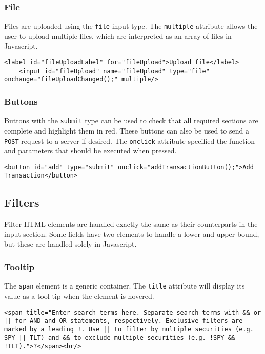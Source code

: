 \documentclass[letterpaper]{article}
\begin{document}
\subsubsection{File}

Files are uploaded using the \lstinline{file} input type.
The \lstinline{multiple} attribute allows the user to upload multiple files, which are interpreted as an array of files in Javascript.
\begin{lstlisting}[firstnumber=64]
    <label id="fileUploadLabel" for="fileUpload">Upload file</label>
    <input id="fileUpload" name="fileUpload" type="file" onchange="fileUploadChanged();" multiple/>
\end{lstlisting}

\subsubsection{Buttons}

Buttons with the \lstinline{submit} type can be used to check that all required sections are complete and highlight them in red.
These buttons can also be used to send a \lstinline{POST} request to a server if desired.
The \lstinline{onclick} attribute specified the function and parameters that should be executed when pressed.
\begin{lstlisting}[firstnumber=70]
<button id="add" type="submit" onclick="addTransactionButton();">Add Transaction</button>
\end{lstlisting}

\subsection{Filters}

Filter HTML elements are handled exactly the same as their counterparts in the input section.
Some fields have two elements to handle a lower and upper bound, but these are handled solely in Javascript.

\subsubsection{Tooltip}

The \lstinline{span} element is a generic container.
The \lstinline{title} attribute will display its value as a tool tip when the element is hovered.
\begin{lstlisting}[firstnumber=118]
<span title="Enter search terms here. Separate search terms with && or || for AND and OR statements, respectively. Exclusive filters are marked by a leading !. Use || to filter by multiple securities (e.g. SPY || TLT) and && to exclude multiple securities (e.g. !SPY && !TLT).">?</span><br/>
\end{lstlisting}
\end{document}
